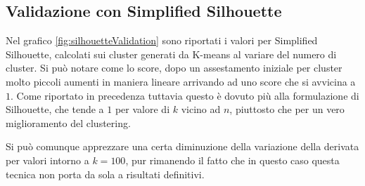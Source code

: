 \documentclass[
	11pt, %
	a4paper, %
	oneside, %
	headinclude,footinclude, %
	BCOR5mm, %
]{scrartcl}
\begin{document}
	\subsection{Validazione con Simplified Silhouette}
		Nel grafico \ref{fig:silhouetteValidation} sono riportati i valori per Simplified Silhouette, calcolati sui cluster generati da K-means al variare del numero di cluster.
		Si può notare come lo score, dopo un assestamento iniziale per cluster molto piccoli aumenti in maniera lineare arrivando ad uno score che si avvicina a $1$.
		Come riportato in precedenza tuttavia questo è dovuto più alla formulazione di Silhouette, che tende a $1$ per valore di $k$ vicino ad $n$, piuttosto che per un vero miglioramento del clustering.
        
		Si può comunque apprezzare una certa diminuzione della variazione della derivata per valori intorno a $k = 100$, pur rimanendo il fatto che in questo caso questa tecnica non porta da sola a risultati definitivi.
    
\end{document}
